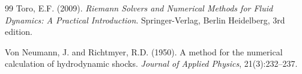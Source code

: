 \documentclass[12pt,a4paper]{article}
\begin{document}
\begin{thebibliography}{99}
Toro, E.F. (2009).
\newblock \emph{Riemann Solvers and Numerical Methods for Fluid Dynamics: A Practical Introduction}.
\newblock Springer-Verlag, Berlin Heidelberg, 3rd edition.

{Von Neumann}, J. and Richtmyer, R.D. (1950).
\newblock A method for the numerical calculation of hydrodynamic shocks.
\newblock \emph{Journal of Applied Physics}, 21(3):232--237.

\end{thebibliography}
\end{document}
